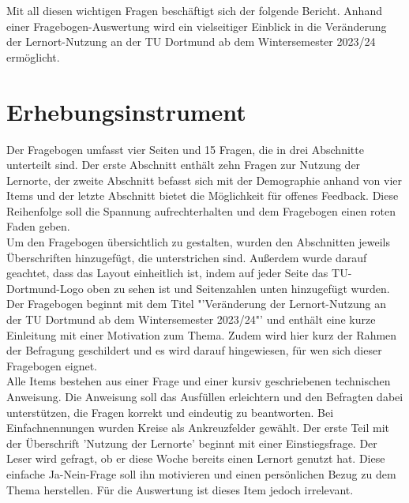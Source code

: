 \documentclass[11pt, a4paper]{article}
\begin{document}
Mit all diesen wichtigen Fragen beschäftigt sich der folgende Bericht.
Anhand einer Fragebogen-Auswertung wird ein vielseitiger Einblick in die Veränderung der Lernort-Nutzung an der TU Dortmund ab dem Wintersemester 2023/24 ermöglicht.


\newpage
\section{Erhebungsinstrument}
\label{Erhebungsinstrument}
Der Fragebogen umfasst vier Seiten und 15 Fragen, die in drei Abschnitte unterteilt sind. Der erste Abschnitt enthält zehn Fragen zur Nutzung der Lernorte, der zweite Abschnitt befasst sich mit der Demographie anhand von vier Items und der letzte Abschnitt bietet die Möglichkeit für offenes Feedback. Diese Reihenfolge soll die Spannung aufrechterhalten und dem Fragebogen einen roten Faden geben.\\

Um den Fragebogen übersichtlich zu gestalten, wurden den Abschnitten jeweils Überschriften hinzugefügt, die unterstrichen sind. Außerdem wurde darauf geachtet, dass das Layout einheitlich ist, indem auf jeder Seite das TU-Dortmund-Logo oben zu sehen ist und Seitenzahlen unten hinzugefügt wurden.
Der Fragebogen beginnt mit dem Titel "'Veränderung der Lernort-Nutzung an der TU Dortmund ab dem Wintersemester 2023/24"' und enthält eine kurze Einleitung mit einer Motivation zum Thema. Zudem wird hier kurz der Rahmen der Befragung geschildert und es wird darauf hingewiesen, für wen sich dieser Fragebogen eignet.\\

Alle Items bestehen aus einer Frage und einer kursiv geschriebenen technischen Anweisung. Die Anweisung soll das Ausfüllen erleichtern und den Befragten dabei unterstützen, die Fragen korrekt und eindeutig zu beantworten. Bei Einfachnennungen wurden Kreise als Ankreuzfelder gewählt.
Der erste Teil mit der Überschrift 'Nutzung der Lernorte' beginnt mit einer Einstiegsfrage.
Der Leser wird gefragt, ob er diese Woche bereits einen Lernort genutzt hat. Diese einfache Ja-Nein-Frage soll ihn motivieren und einen persönlichen Bezug zu dem Thema herstellen. Für die Auswertung ist dieses Item jedoch irrelevant.\\
\end{document}
